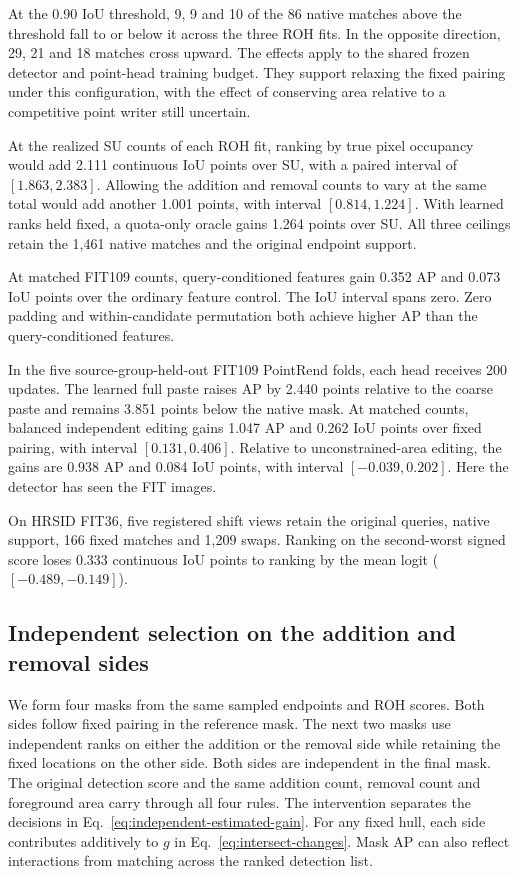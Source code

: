 \documentclass[journal]{IEEEtran}
\begin{document}
At the 0.90 IoU threshold, 9, 9 and 10 of the 86 native matches above the threshold fall to or below it across the three ROH fits. In the opposite direction, 29, 21 and 18 matches cross upward. The effects apply to the shared frozen detector and point-head training budget. They support relaxing the fixed pairing under this configuration, with the effect of conserving area relative to a competitive point writer still uncertain.

At the realized SU counts of each ROH fit, ranking by true pixel occupancy would add 2.111 continuous IoU points over SU, with a paired interval of \([1.863,2.383]\). Allowing the addition and removal counts to vary at the same total would add another 1.001 points, with interval \([0.814,1.224]\). With learned ranks held fixed, a quota-only oracle gains 1.264 points over SU. All three ceilings retain the 1,461 native matches and the original endpoint support.

At matched FIT109 counts, query-conditioned features gain 0.352 AP and 0.073 IoU points over the ordinary feature control. The IoU interval spans zero. Zero padding and within-candidate permutation both achieve higher AP than the query-conditioned features.

In the five source-group-held-out FIT109 PointRend folds, each head receives 200 updates. The learned full paste raises AP by 2.440 points relative to the coarse paste and remains 3.851 points below the native mask. At matched counts, balanced independent editing gains 1.047 AP and 0.262 IoU points over fixed pairing, with interval \([0.131,0.406]\). Relative to unconstrained-area editing, the gains are 0.938 AP and 0.084 IoU points, with interval \([-0.039,0.202]\). Here the detector has seen the FIT images.

On HRSID FIT36, five registered shift views retain the original queries, native support, 166 fixed matches and 1,209 swaps. Ranking on the second-worst signed score loses 0.333 continuous IoU points to ranking by the mean logit (\([-0.489,-0.149]\)).

\subsection{Independent selection on the addition and removal sides}
\label{sec:side-ablation}

We form four masks from the same sampled endpoints and ROH scores. Both sides follow fixed pairing in the reference mask. The next two masks use independent ranks on either the addition or the removal side while retaining the fixed locations on the other side. Both sides are independent in the final mask. The original detection score and the same addition count, removal count and foreground area carry through all four rules. The intervention separates the decisions in Eq.~\eqref{eq:independent-estimated-gain}. For any fixed hull, each side contributes additively to \(g\) in Eq.~\eqref{eq:intersect-changes}. Mask AP can also reflect interactions from matching across the ranked detection list.
\end{document}
